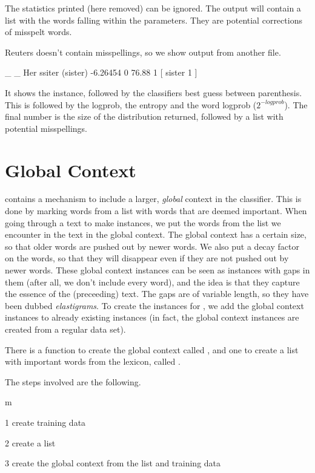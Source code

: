 \documentclass[a4paper,10pt,twoside]{report}
\begin{document}
The statistics printed (here removed) can be ignored. The output will
contain a list with the words falling within the parameters. They are
potential corrections of misspelt words.

Reuters doesn't contain misspellings, so we show output from another
file.

\begin{wout}{}
_ _ Her ssiter (sister) -6.26454 0 76.88 1 [ sister 1 ]
\end{wout}

It shows the instance, followed by the classifiers best guess between
parenthesis. This is followed by the logprob, the entropy and the word
logprob ($2^{-logprob}$). The final number is the size of the \Timbl{}
distribution returned, followed by a list with potential misspellings.

\section{Global Context}

\Wopr{} contains a mechanism to include a larger, \emph{global}
context in the classifier. This is done by marking words from a list
with words that are deemed important. When going through a text to
make instances, we put the words from the list we encounter in the
text in the global context. The global context has a certain size, so
that older words are pushed out by newer words. We also put a decay
factor on the words, so that they will disappear even if they are not
pushed out by newer words. These global context instances can be seen
as instances with gaps in them (after all, we don't include every
word), and the idea is that they capture the essence of the
(preceeding) text. The gaps are of variable length, so they have been
dubbed \emph{elastigrams}. To create the instances for \Timbl{}, we
add the global context instances to already existing 
instances (in fact, the global context instances are created from a
regular data set).

There is a function to create the global context called
, and one to create a list with important words from the
lexicon, called .

The steps involved are the following.

\begin{varlist}{m}
\item[1] create training data
\item[2] create a list
\item[3] create the global context from the list and training data
\end{varlist}
\end{document}
